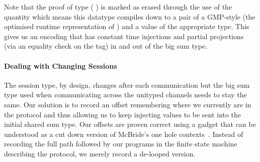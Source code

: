 \documentclass{easychair}
\begin{document}

Note that the proof of type
(   )
is marked as erased through the use of the 
quantity which means this datatype compiles down to a pair of a
GMP-style  (the optimised runtime representation of )
and a value of the appropriate type.
%
This gives us an encoding that has constant time injections
and partial projections (via an equality check on the  tag)
in and out of the big sum type.

\paragraph{Dealing with Changing Sessions}
The session type, by design, changes after each communication
but the big sum type used when communicating across the
unityped channels needs to stay the same.
%
Our solution is to record an offset remembering where we currently
are in the protocol and thus allowing us to keep injecting values to
be sent into the initial shared sum type.
%
Our offsets are proven correct using a gadget that can be understood
as a cut down version of McBride's one hole
contexts~\cite{DBLP:conf/popl/McBride08}. Instead
of recording the full path followed by our programs in the finite
state machine describing the protocol,
we merely record a de-looped version.
\end{document}
